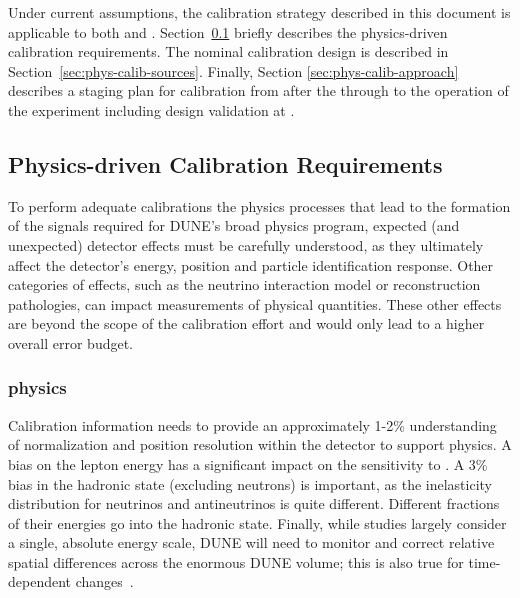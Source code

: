 Under current assumptions, the calibration strategy described in this document is applicable to both  and . 
Section~\ref{sec:phys-calib-req} briefly describes the physics-driven calibration requirements. 
The nominal   calibration design is described in Section~\ref{sec:phys-calib-sources}. Finally,
Section \ref{sec:phys-calib-approach} describes a staging plan for calibration
from after the  through to the operation of the experiment including design validation at .





\subsection{Physics-driven Calibration Requirements}
\label{sec:phys-calib-req}


To perform adequate calibrations the physics processes that lead to the formation of the signals required for DUNE's broad physics program,
expected (and unexpected) detector effects must be carefully understood, as they ultimately affect the detector's energy, position and particle identification response. 
Other categories of effects, such as the neutrino interaction model or reconstruction pathologies, can impact measurements of physical quantities. These other effects are beyond the scope of the  calibration effort and would only lead to a higher overall error budget.

\subsubsection{ physics}
\label{sec:phys-calib-lbl}

Calibration information needs to provide an approximately 1-2\% understanding of normalization 
and position resolution within the detector to support   physics. 
A bias on the lepton energy has a significant impact on the sensitivity to . 
%
A \num{3}\% bias in the hadronic state (excluding neutrons) is important, as the inelasticity  distribution for neutrinos and antineutrinos is quite different.  Different fractions of their energies go into the hadronic state. Finally, while studies largely consider a single, absolute energy scale, DUNE will need to monitor and correct relative spatial differences across the enormous DUNE  volume; this is also true for time-dependent changes~\cite{ebias}.

